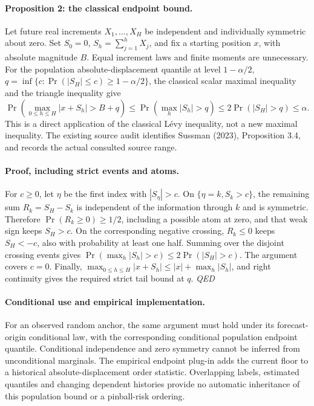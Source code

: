 \documentclass[11pt,a4paper]{article}
\begin{document}
\paragraph{Proposition 2: the classical endpoint bound.}
Let future real increments \(X_1,\ldots,X_H\) be independent and individually
symmetric about zero. Set \(S_0=0\), \(S_h=\sum_{j=1}^hX_j\), and fix a starting
position \(x\), with absolute magnitude \(B\). Equal increment laws and finite moments are unnecessary.
For the population absolute-displacement quantile at level \(1-\alpha/2\),
\(q=\inf\{c:\Pr(|S_H|\le c)\ge1-\alpha/2\}\), the classical scalar maximal
inequality and the triangle inequality give
\[
\Pr\!\left(\max_{0\le h\le H}|x+S_h|>B+q\right)\le\Pr\!\left(\max_h|S_h|>q\right)\le2\Pr(|S_H|>q)\le\alpha.
\]
This is a direct application of the classical L\'evy inequality, not a new
maximal inequality. The existing source audit identifies Sussman (2023),
Proposition 3.4, and records the actual consulted source range.

\paragraph{Proof, including strict events and atoms.}
For \(c\ge0\), let \(\eta\) be the first index with \(|S_\eta|>c\). On
\(\{\eta=k,S_k>c\}\), the remaining sum \(R_k=S_H-S_k\) is independent of
the information through \(k\) and is symmetric. Therefore \(\Pr(R_k\ge0)\ge1/2\),
including a possible atom at zero, and that weak sign keeps \(S_H>c\).
On the corresponding negative crossing, \(R_k\le0\) keeps \(S_H<-c\), also
with probability at least one half. Summing over the disjoint crossing events
gives \(\Pr(\max_h|S_h|>c)\le2\Pr(|S_H|>c)\). The argument covers \(c=0\).
Finally, \(\max_{0\le h\le H}|x+S_h|\le |x|+\max_h|S_h|\), and right
continuity gives the required strict tail bound at \(q\). \hfill\textit{QED}

\paragraph{Conditional use and empirical implementation.}
For an observed random anchor, the same argument must hold under its
forecast-origin conditional law, with the corresponding conditional population
endpoint quantile. Conditional independence and zero symmetry cannot be inferred
from unconditional marginals. The empirical endpoint plug-in adds the current
floor to a historical absolute-displacement order statistic. Overlapping labels,
estimated quantiles and changing dependent histories provide no automatic
inheritance of this population bound or a pinball-risk ordering.
\end{document}
